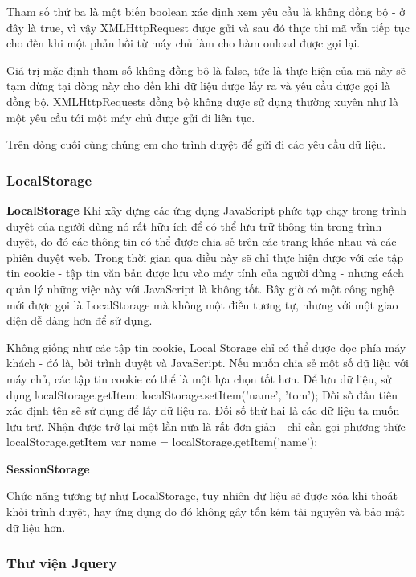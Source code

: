 Tham số thứ ba là một biến boolean xác định xem yêu cầu là không đồng bộ - ở đây là true, vì vậy XMLHttpRequest được gửi và sau đó thực thi mã vẫn tiếp tục cho đến khi một phản hồi từ máy chủ làm cho hàm onload được gọi lại.

Giá trị mặc định tham số không đồng bộ là false, tức là thực hiện của mã này sẽ tạm dừng tại dòng này cho đến khi dữ liệu được lấy ra và yêu cầu được gọi là đồng bộ. XMLHttpRequests đồng bộ không được sử dụng thường xuyên như là một yêu cầu tới một máy chủ được gửi đi liên tục.

Trên dòng cuối cùng chúng em cho trình duyệt để gửi đi các yêu cầu dữ liệu.

\subsubsection{LocalStorage}

\textbf{LocalStorage}
Khi xây dựng các ứng dụng JavaScript phức tạp chạy trong trình duyệt của người dùng nó rất hữu ích để có thể lưu trữ thông tin trong trình duyệt, do đó các thông tin có thể được chia sẻ trên các trang khác nhau và các phiên duyệt web.
Trong thời gian qua điều này sẽ chỉ thực hiện được với các tập tin cookie - tập tin văn bản được lưu vào máy tính của người dùng - nhưng cách quản lý những việc này với JavaScript là không tốt. Bây giờ có một công nghệ mới được gọi là LocalStorage mà không một điều tương tự, nhưng với một giao diện dễ dàng hơn để sử dụng.

Không giống như các tập tin cookie, Local Storage chỉ có thể được đọc phía máy khách - đó là, bởi trình duyệt và JavaScript. Nếu muốn chia sẻ một số dữ liệu với máy chủ, các tập tin cookie có thể là một lựa chọn tốt hơn.
Để lưu dữ liệu, sử dụng localStorage.getItem:
localStorage.setItem('name', 'tom'); 
Đối số đầu tiên xác định tên sẽ sử dụng để lấy dữ liệu ra. Đối số thứ hai là các dữ liệu ta muốn lưu trữ.
Nhận được trở lại một lần nữa là rất đơn giản - chỉ cần gọi phương thức localStorage.getItem
var name = localStorage.getItem('name');


\textbf{SessionStorage}

Chức năng tương tự như LocalStorage, tuy nhiên dữ liệu sẽ được xóa khi thoát khỏi trình duyệt, hay ứng dụng do đó không gây tốn kém tài nguyên và bảo mật dữ liệu hơn.


\subsubsection{Thư viện Jquery}

